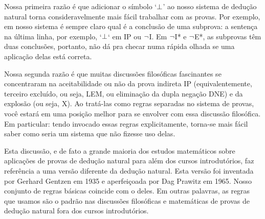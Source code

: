 Nossa primeira razão é que adicionar o símbolo `$\bot$' ao nosso sistema de dedução natural torna consideravelmente mais fácil trabalhar com as provas. Por exemplo, em nosso sistema é sempre claro qual é a conclusão de uma subprova: a sentença na última linha, por exemplo,       `$\bot$` em IP ou $\neg$I. Em $\neg$I* e $\neg$E*, as subprovas têm duas conclusões, portanto, não dá pra checar numa rápida olhada se uma aplicação delas está correta.

Nossa segunda razão é que muitas discussões filosóficas fascinantes se concentraram na aceitabilidade ou não da prova indireta IP (equivalentemente, terceiro excluído, ou seja, LEM, ou eliminação da dupla negação DNE) e da explosão (ou seja, X). Ao tratá-las como regras separadas no sistema de provas, você estará em uma posição melhor para se envolver com essa discussão filosófica. Em particular: tendo invocado essas regras explicitamente, torna-se mais fácil saber como seria um sistema que não fizesse uso delas.

Esta discussão, e de fato a grande maioria dos estudos matemáticos sobre aplicações de provas de dedução natural para além dos cursos introdutórios, faz referência a uma versão diferente da dedução natural. Esta versão foi inventada por Gerhard Gentzen em 1935 e aperfeiçoada por Dag Prawitz em 1965. Nosso conjunto de regras básicas coincide com o deles. Em outras palavras, as regras que usamos são o padrão nas discussões filosóficas e matemáticas de provas de dedução natural fora dos cursos introdutórios. 


